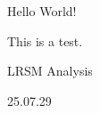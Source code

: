 \documentclass{article}
\begin{document}
Hello World!

This is a test.

LRSM Analysis

25.07.29
\end{document}
